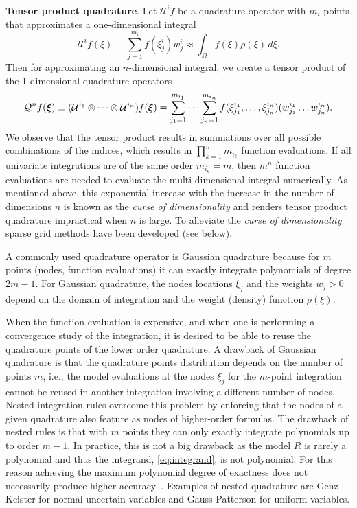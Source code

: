 \textbf{Tensor product quadrature}.
Let $\mathcal{U}^i f$ be a quadrature operator with $m_i$ points that approximates a one-dimensional integral
\begin{equation}
  \mathcal{U}^i f(\xi) \equiv \sum_{j=1}^{m_i} f(\xi_j^i)w_j^i \approx \int_\Omega f(\xi)\rho(\xi)\, d\xi.
\end{equation}
Then for approximating an $n$-dimensional integral, we create a tensor product of the 1-dimensional quadrature operators
\begin{equation}
  \mathcal{Q}^n f(\boldsymbol{\xi}) \equiv (\mathcal{U}^{i_1} \otimes \cdots \otimes \mathcal{U}^{i_n}) f(\boldsymbol{\xi}) = \sum_{j_1=1}^{m_{i_1}} \cdots \sum_{j_n=1}^{m_{i_n}} f(\xi_{j_1}^{i_1},\ldots,\xi_{j_n}^{i_n})(w_{j_1}^{i_1} \ldots w_{j_n}^{i_n}).
\end{equation}
We observe that the tensor product results in summations over all possible combinations of the indices, which results in $\prod_{k=1}^n m_{i_k}$ function evaluations. If all univariate integrations are of the same order $m_{i_k}=m$, then $m^n$ function evaluations are needed to evaluate the multi-dimensional integral numerically. As mentioned above, this exponential increase with the increase in the number of dimensions $n$ is known as the \textit{curse of dimensionality} and renders tensor product quadrature impractical when $n$ is large. To alleviate the \textit{curse of dimensionality} sparse grid methods have been developed (see below).

A commonly used quadrature operator is Gaussian quadrature because for $m$ points (nodes, function evaluations) it can exactly integrate polynomials of degree $2m-1$.
For Gaussian quadrature, the nodes locations $\xi_j$ and the weights $w_j>0$ depend on the domain of integration and the weight (density) function $\rho(\xi)$.

When the function evaluation is expensive, and when one is performing a convergence study of the integration, it is desired to be able to reuse the quadrature points of the lower order quadrature. A drawback of Gaussian quadrature is that the quadrature points distribution depends on the number of points $m$, i.e., the model evaluations at the nodes $\xi_j$ for the $m$-point integration cannot be reused in another integration involving a different number of nodes. Nested integration rules overcome this problem by enforcing that the nodes of a given quadrature also feature as nodes of higher-order formulas. The drawback of nested rules is that with $m$ points they can only exactly integrate polynomials up to order $m-1$.
In practice, this is not a big drawback as the model $R$ is rarely a polynomial and thus the integrand, \cref{eq:integrand}, is not polynomial. For this reason achieving the maximum polynomial degree of exactness does not necessarily produce higher  accuracy~\cite{Trefethen2008}. Examples of nested quadrature are Genz-Keister for normal uncertain variables and Gauss-Patterson for uniform variables.

